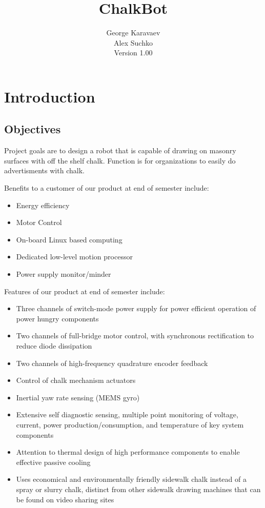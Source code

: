 \documentclass[12pt]{article}
\title{ChalkBot}
\author{George Karavaev\\ Alex Suchko\\ \normalsize Version 1.00}
\begin{document}
  \maketitle 
 \newpage
 \tableofcontents
 \listoffigures
 \newpage
 \section{Introduction}
 \subsection{Objectives}
 Project goals are to design a robot that is capable of drawing on masonry surfaces with off the shelf chalk. Function is for organizations to easily do advertisments with chalk.
 
 Benefits to a customer of our product at end of semester include:
 \begin{itemize}
  \item Energy efficiency
  \item Motor Control
  \item On-board Linux based computing
  \item Dedicated low-level motion processor
  \item Power supply monitor/minder
\end{itemize}
Features of our product at end of semester include:
   \begin{itemize}
  \item Three channels of switch-mode power supply for power efficient operation of power hungry components
  \item Two channels of full-bridge motor control, with synchronous rectification to reduce diode dissipation
  \item Two channels of high-frequency quadrature encoder feedback
  \item Control of chalk mechanism actuators
  \item Inertial yaw rate sensing (MEMS gyro)
  \item Extensive self diagnostic sensing, multiple point monitoring of voltage, current, power production/consumption, and temperature of key system components
  \item Attention to thermal design of high performance components to enable effective passive cooling
  \item Uses economical and environmentally friendly sidewalk chalk instead of a spray or slurry chalk, distinct from other sidewalk drawing machines that can be found on video sharing sites
\end{itemize}
  
\end{document}
